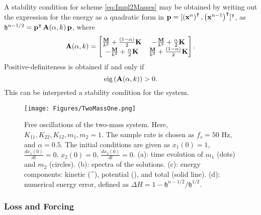 \documentclass[11pt,twoside,a4paper,english]{book}
\begin{document}
A stability condition for scheme \eqref{eq:Impl2Masses} may be obtained by writing out the expression for the energy as a quadratic form in ${\bf p} = [\left({\bf x}^n\right)^{\intercal}, \left({\bf x}^{n-1}\right)^{\intercal}]^{\intercal}$, as $\mathfrak{h}^{n-1/2} = {\bf p}^{\intercal}\,{\bf A}(\alpha,k)\,{\bf p}$, where
\begin{equation}
{\bf A}(\alpha,k) = 
\begin{bmatrix}
\frac{{\bf M}}{k^2} + \frac{(1-\alpha)}{2}{\bf K} & -\frac{{\bf M}}{k^2} +\frac{\alpha}{2}{\bf K} \\ -\frac{{\bf M}}{k^2} + \frac{\alpha}{2}{\bf K} & \frac{{\bf M}}{k^2} + \frac{(1-\alpha)}{2}{\bf K}
\end{bmatrix}.
\end{equation}
Positive-definiteness is obtained if and only if 
\begin{equation}\label{eq:StabCondMasses}
\text{eig}\left({\bf A}(\alpha,k)\right) > 0.
\end{equation}
This can be interpreted a stability condition for the system.
\begin{figure}[hbt]
\centering{}
\texttt{[image: Figures/TwoMassOne.png]}
\caption{Free oscillations of the two-mass system. Here, $K_{11},K_{22},K_{12},m_1,m_2=1$. The sample rate is chosen as $f_s = 50$ Hz, and $\alpha = 0.5$. The initial conditions are given as $x_1(0) = 1$, $\frac{dx_1(0)}{dt} =0$, $x_2(0) = 0$, $\frac{dx_2(0)}{dt} =0$. (a): time evolution of $m_1$ (dots) and $m_2$ (circles). (b): spectra of the solutions. (c): energy components: kinetic (\^{}), potential (\text{*}), and total (solid line). (d): numerical energy  error, defined as $\Delta H = 1 - \mathfrak{h}^{n-1/2}/\mathfrak{h}^{1/2}$.}\label{fig:TwoMassOne}
\end{figure}


\subsubsection{Loss and Forcing}
\end{document}
